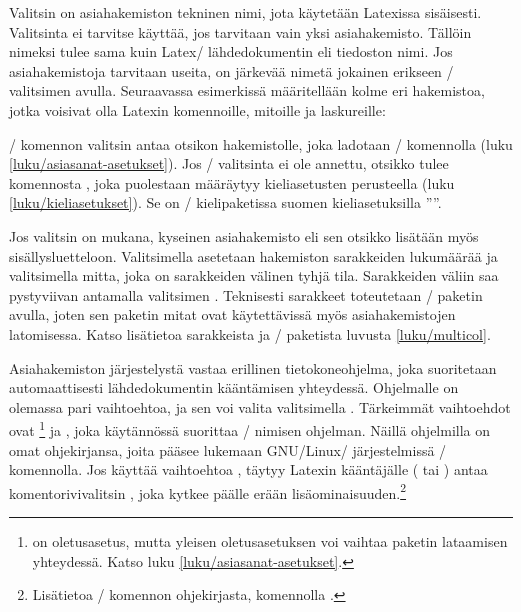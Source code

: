 Valitsin  on asiahakemiston tekninen nimi, jota käytetään
Latexissa sisäisesti. Valitsinta ei tarvitse käyttää, jos tarvitaan vain
yksi asiahakemisto. Tällöin nimeksi tulee sama kuin Latex\-/
lähdedokumentin eli tiedoston nimi. Jos asiahakemistoja tarvitaan
useita, on järkevää nimetä jokainen erikseen \-/ valitsimen
avulla. Seuraavassa esimerkissä määritellään kolme eri hakemistoa, jotka
voisivat olla Latexin komennoille, mitoille ja laskureille:

\begin{koodilohkosis}
\makeindex[name=komennot, title=Komennot, columns=2, intoc]
\makeindex[name=mitat,    title=Mitat,    columns=2, intoc]
\makeindex[name=laskurit, title=Laskurit, columns=2, intoc]
\end{koodilohkosis}

\noindent
{}\-/ komennon valitsin  antaa otsikon
hakemistolle, joka ladotaan \-/ komennolla (luku
\ref{luku/asiasanat-asetukset}). Jos \-/ valitsinta ei ole
annettu, otsikko tulee komennosta , joka puolestaan
määräytyy kieliasetusten perusteella (luku \ref{luku/kieliasetukset}).
Se on \-/ kielipaketissa suomen kieliasetuksilla
''\indexname''.

Jos valitsin  on mukana, kyseinen asiahakemisto eli sen
otsikko lisätään myös sisällysluetteloon. Valitsimella 
asetetaan hakemiston sarakkeiden lukumäärää ja valitsimella
 mitta, joka on sarakkeiden välinen tyhjä tila.
Sarakkeiden väliin saa pystyviivan antamalla valitsimen
. Teknisesti sarakkeet toteutetaan
\-/ paketin avulla, joten sen paketin mitat ovat
käytettävissä myös asiahakemistojen latomisessa. Katso lisätietoa
sarakkeista ja \-/ paketista luvusta
\ref{luku/multicol}.

Asiahakemiston järjestelystä vastaa erillinen tietokoneohjelma, joka
suoritetaan automaattisesti lähdedokumentin kääntämisen yhteydessä.
Ohjelmalle on olemassa pari vaihtoehtoa, ja sen voi valita valitsimella
. Tärkeimmät vaihtoehdot ovat
\footnote{ on
  oletusasetus, mutta yleisen oletusasetuksen voi vaihtaa paketin
  lataamisen yhteydessä. Katso luku \ref{luku/asiasanat-asetukset}.} ja
, joka käytännössä suorittaa \-/ nimisen
ohjelman. Näillä ohjelmilla on omat ohjekirjansa, joita pääsee lukemaan
GNU/\katk Linux\-/ järjestelmissä \-/ komennolla. Jos käyttää
vaihtoehtoa , täytyy Latexin kääntäjälle
( tai ) antaa komentorivivalitsin
, joka kytkee päälle erään
lisäominaisuuden.\footnote{Lisätietoa \-/ komennon
  ohjekirjasta, komennolla .}

